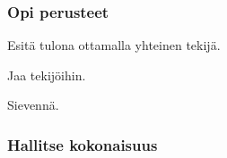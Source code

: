 \begin{tehtavasivu}

\subsubsection*{Opi perusteet}

\begin{tehtava}
    Esitä tulona ottamalla yhteinen tekijä.
    \begin{alakohdat}
    \end{alakohdat}
    \begin{vastaus}
        \begin{alakohdat}
        \end{alakohdat}
    \end{vastaus}
\end{tehtava}

\begin{tehtava}
    Jaa tekijöihin.
    \begin{alakohdat}
    \end{alakohdat}
    \begin{vastaus}
        \begin{alakohdat}
        \end{alakohdat}
    \end{vastaus}
\end{tehtava}

\begin{tehtava}
    Sievennä.
    \begin{alakohdat}
    \end{alakohdat}
    \begin{vastaus}
        \begin{alakohdat}
        \end{alakohdat}
    \end{vastaus}
\end{tehtava}

\subsubsection*{Hallitse kokonaisuus}


\end{tehtavasivu}
